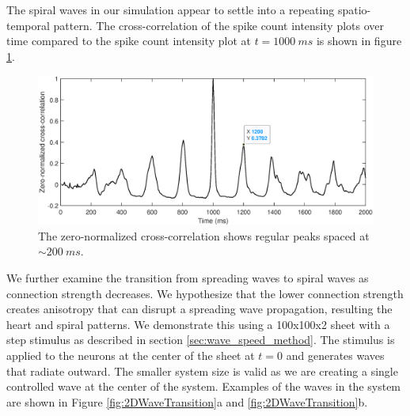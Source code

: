 \documentclass[12pt]{article}
\begin{document}
The spiral waves in our simulation appear to settle into a repeating spatio-temporal pattern.
The cross-correlation of the spike count intensity plots over time compared to the spike count intensity plot at $t=1000~ms$
is shown in figure \ref{fig:2DSpiralWaveCrossCorrelation}.
\begin{figure}[!htb]
 \caption{ The zero-normalized cross-correlation shows regular peaks spaced at $\sim 200~ms$.
           }
 \label{fig:2DSpiralWaveCrossCorrelation}
 \centering
   \includegraphics[width=\textwidth]{fig/2DSpiral_CrossCorrelation}
\end{figure}
\FloatBarrier


We further examine the transition from spreading waves to spiral waves as connection strength decreases.
We hypothesize that the lower connection strength creates anisotropy that can disrupt a spreading wave propagation, resulting the heart and spiral patterns. 
We demonstrate this using a 100x100x2 sheet with a step stimulus as described in section \ref{sec:wave_speed_method}.
The stimulus is applied to the neurons at the center of the sheet at $t=0$ and generates waves that radiate outward.
The smaller system size is valid as we are creating a single controlled wave at the center of the system.
Examples of the waves in the system are shown in Figure \ref{fig:2DWaveTransition}a and \ref{fig:2DWaveTransition}b.
\end{document}
